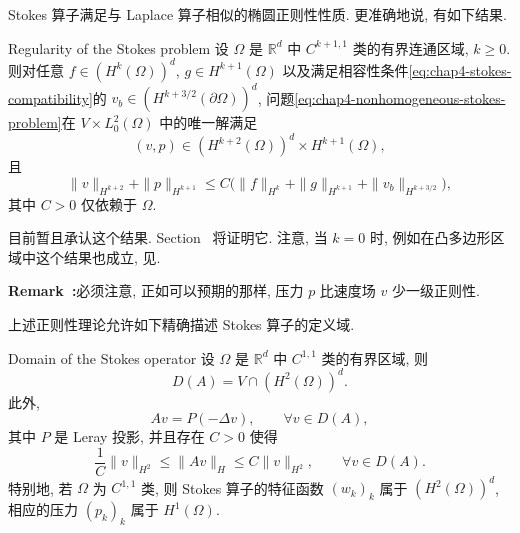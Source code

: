 Stokes 算子满足与 Laplace 算子相似的椭圆正则性性质. 更准确地说, 有如下结果.

\begin{Theorem}{Regularity of the Stokes problem}
\label{thm:chap4-stokes-regularity}
设 $\Omega$ 是 $\mathbb R^d$ 中 $C^{k+1,1}$ 类的有界连通区域, $k\geq0$. 则对任意 $f\in(H^k(\Omega))^d$, $g\in H^{k+1}(\Omega)$ 以及满足相容性条件\eqref{eq:chap4-stokes-compatibility}的 $v_b\in(H^{k+3/2}(\partial\Omega))^d$, 问题\eqref{eq:chap4-nonhomogeneous-stokes-problem}在 $V\times L_0^2(\Omega)$ 中的唯一解满足
\[
 (v,p)\in(H^{k+2}(\Omega))^d\times H^{k+1}(\Omega),
\]
且
\[
 \|v\|_{H^{k+2}}+\|p\|_{H^{k+1}}
 \leq C\bigl(\|f\|_{H^k}+\|g\|_{H^{k+1}}+\|v_b\|_{H^{k+3/2}}\bigr),
\]
其中 $C>0$ 仅依赖于 $\Omega$.
\end{Theorem}

目前暂且承认这个结果. Section~ 将证明它. 注意, 当 $k=0$ 时, 例如在凸多边形区域中这个结果也成立, 见.

\par\noindent{}\textbf{Remark~\thechapterfoursectionfiveremark:}\label{rem:chap4-stokes-pressure-one-less-regularity}\quad 必须注意, 正如可以预期的那样, 压力 $p$ 比速度场 $v$ 少一级正则性.

上述正则性理论允许如下精确描述 Stokes 算子的定义域.

\begin{Proposition}{Domain of the Stokes operator}
\label{prop:chap4-stokes-operator-domain}
设 $\Omega$ 是 $\mathbb R^d$ 中 $C^{1,1}$ 类的有界区域, 则
\[
 D(A)=V\cap(H^2(\Omega))^d.
\]
此外,
\[
 Av=P(-\Delta v),\qquad\forall v\in D(A),
\]
其中 $P$ 是 Leray 投影, 并且存在 $C>0$ 使得
\[
 \frac1C\|v\|_{H^2}\leq\|Av\|_H\leq C\|v\|_{H^2},
 \qquad\forall v\in D(A).
\]
特别地, 若 $\Omega$ 为 $C^{1,1}$ 类, 则 Stokes 算子的特征函数 $(w_k)_k$ 属于 $(H^2(\Omega))^d$, 相应的压力 $(p_k)_k$ 属于 $H^1(\Omega)$.
\end{Proposition}

